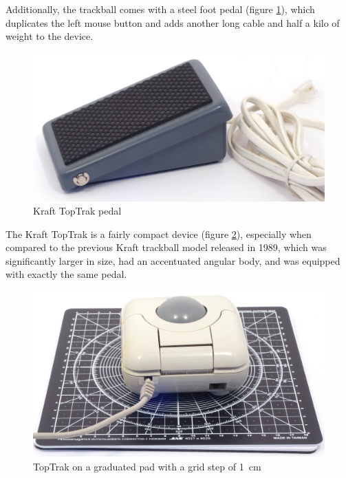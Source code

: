 \documentclass[11pt, a4paper]{article}
\begin{document}
Additionally, the trackball comes with a steel foot pedal (figure \ref{fig:TopTrakPedal}), which duplicates the left mouse button and adds another long cable and half a kilo of weight \cite{mouses} to the device.

\begin{figure}[h]
    \centering
    \includegraphics[scale=0.45]{1990_kraft_toptrack/pedal_30.jpg}
    \caption{Kraft TopTrak pedal}
    \label{fig:TopTrakPedal}
\end{figure}


The Kraft TopTrak is a fairly compact device (figure \ref{fig:TopTrakSize}), especially when compared to the previous Kraft trackball model released in 1989, which was significantly larger in size, had an accentuated angular body, and was equipped with exactly the same pedal.

\begin{figure}[h]
    \centering
    \includegraphics[scale=0.35]{1990_kraft_toptrack/2.6_30.jpg}
    \caption{TopTrak on a graduated pad with a grid step of 1~cm}
    \label{fig:TopTrakSize}
\end{figure}
\end{document}
